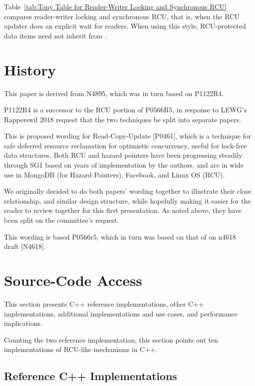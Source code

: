 Table~\ref{tab:Tony Table for Reader-Writer Locking and Synchronous RCU}
compares reader-writer locking and synchronous RCU, that is, when the
RCU updater does an explicit wait for readers.
When using this style, RCU-protected data items need not inherit from
.

\section{History}
\label{sec:History}

This paper is derived from N4895, which was in turn based on P1122R4.

P1122R4 is a successor to the RCU portion of P0566R5, in response to
LEWG’s Rapperswil 2018 request that the two techniques be split into
separate papers.

This is proposed wording for Read-Copy-Update [P0461], which is
a technique for safe deferred resource reclamation for optimistic
concurrency, useful for lock-free data structures.
Both RCU and hazard pointers have been progressing steadily through SG1
based on years of implementation by the authors, and are in wide use in
MongoDB (for Hazard Pointers), Facebook, and Linux OS (RCU).

We originally decided to do both papers' wording together to illustrate
their close relationship, and similar design structure, while hopefully
making it easier for the reader to review together for this first
presentation.
As noted above, they have been split on the committee's request.

This wording is based P0566r5, which in turn was based on that of on
n4618 draft [N4618].

\section{Source-Code Access}
\label{sec:Source-Code Access}

This section presents C++ reference implementations, other
C++ implementations, additional implementations and use cases,
and performance implications.

Counting the two reference implementation, this section points out
ten implementations of RCU-like mechanisms in C++.

\subsection{Reference C++ Implementations}
\label{sec:Reference C++ Implementations}

